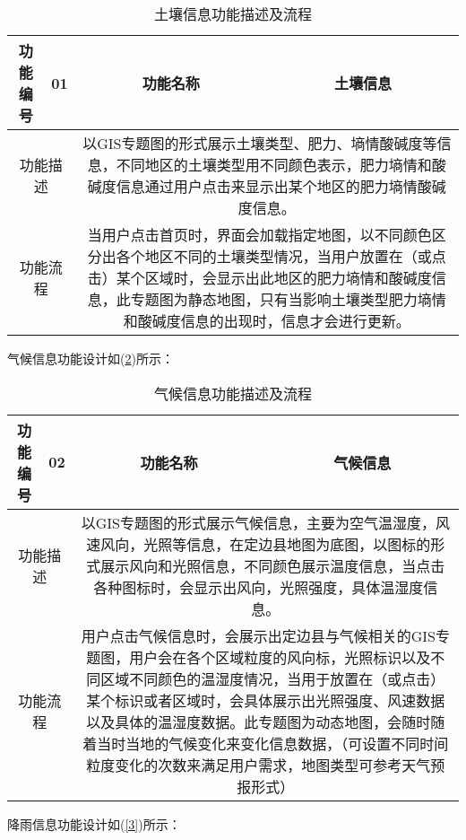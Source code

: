     \begin{table}[H]
	\centering
	\caption[土壤信息]{土壤信息功能描述及流程}
	\label{1}
	\begin{tabular}{|c|c|c|c|}
		
		\hline
		功能编号&01&功能名称&土壤信息\\
		\hline
		\multicolumn{2}{|c|}{功能描述}&\multicolumn{2}{c|}{\multirow{1}{0.7\textwidth}{以GIS专题图的形式展示土壤类型、肥力、墒情酸碱度等信息，不同地区的土壤类型用不同颜色表示，肥力墒情和酸碱度信息通过用户点击来显示出某个地区的肥力墒情酸碱度信息。}}\\[6ex]
		\hline
		\multicolumn{2}{|c|}{功能流程}&\multicolumn{2}{c|}{\multirow{1}{0.7\textwidth}{当用户点击首页时，界面会加载指定地图，以不同颜色区分出各个地区不同的土壤类型情况，当用户放置在（或点击）某个区域时，会显示出此地区的肥力墒情和酸碱度信息，此专题图为静态地图，只有当影响土壤类型肥力墒情和酸碱度信息的出现时，信息才会进行更新。}}\\[10ex]
		\hline
		

	\end{tabular}
    \end{table}
气候信息功能设计如(\ref{2})所示：

\begin{table}[H]
	\centering
	\caption[气候信息]{气候信息功能描述及流程}
	\label{2}
	\begin{tabular}{|c|c|c|c|}
		
		\hline
		功能编号&02&功能名称&气候信息\\
		\hline
		\multicolumn{2}{|c|}{功能描述}&\multicolumn{2}{c|}{\multirow{1}{0.7\textwidth}{以GIS专题图的形式展示气候信息，主要为空气温湿度，风速风向，光照等信息，在定边县地图为底图，以图标的形式展示风向和光照信息，不同颜色展示温度信息，当点击各种图标时，会显示出风向，光照强度，具体温湿度信息。}}\\[10ex]
		\hline
		\multicolumn{2}{|c|}{功能流程}&\multicolumn{2}{c|}{\multirow{1}{0.7\textwidth}{用户点击气候信息时，会展示出定边县与气候相关的GIS专题图，用户会在各个区域粒度的风向标，光照标识以及不同区域不同颜色的温湿度情况，当用于放置在（或点击）某个标识或者区域时，会具体展示出光照强度、风速数据以及具体的温湿度数据。此专题图为动态地图，会随时随着当时当地的气候变化来变化信息数据，（可设置不同时间粒度变化的次数来满足用户需求，地图类型可参考天气预报形式）}}\\[16ex]
		\hline
		
		
	\end{tabular}
\end{table}
降雨信息功能设计如(\ref{3})所示：

